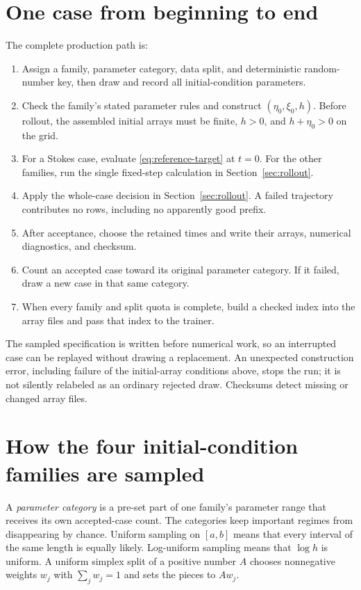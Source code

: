 \documentclass[10pt]{article}
\begin{document}
\section{One case from beginning to end}
\label{sec:pipeline}

The complete production path is:
\begin{enumerate}
  \item Assign a family, parameter category, data split, and deterministic
        random-number key, then draw and record all initial-condition
        parameters.
  \item Check the family's stated parameter rules and construct
        $(\eta_0,\xi_0,h)$.  Before rollout, the assembled initial arrays
        must be finite, \(h>0\), and \(h+\eta_0>0\) on the grid.
  \item For a Stokes case, evaluate \eqref{eq:reference-target} at $t=0$.
        For the other families, run the single fixed-step calculation in
        Section~\ref{sec:rollout}.
  \item Apply the whole-case decision in Section~\ref{sec:rollout}.  A failed
        trajectory contributes no rows, including no apparently good prefix.
  \item After acceptance, choose the retained times and write their arrays,
        numerical diagnostics, and checksum.
  \item Count an accepted case toward its original parameter category.  If it
        failed, draw a new case in that same category.
  \item When every family and split quota is complete, build a checked index
        into the array files and pass that index to the trainer.
\end{enumerate}
The sampled specification is written before numerical work, so an
interrupted case can be replayed without drawing a replacement.  An
unexpected construction error, including failure of the initial-array
conditions above, stops the run; it is not silently relabeled as an ordinary
rejected draw.  Checksums detect missing or changed array files.

\section{How the four initial-condition families are sampled}
\label{sec:families}

A \emph{parameter category} is a pre-set part of one family's parameter
range that receives its own accepted-case count.  The categories keep important
regimes from disappearing by chance.  Uniform sampling on $[a,b]$ means
that every interval of the same length is equally likely.  Log-uniform
sampling means that $\log h$ is uniform.  A uniform simplex split of a
positive number $A$ chooses nonnegative weights $w_j$ with
$\sum_jw_j=1$ and sets the pieces to $Aw_j$.
\end{document}
